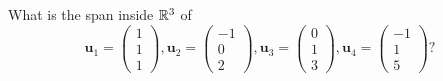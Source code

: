 \documentclass[10pt, a4paper]{article}
\newcommand{\mbf}[1]{\mathbf{#1}}
\begin{document}
\begin{example}
    What is the span inside $\mathbb{R} ^ 3$ of
    \[
    \mbf{u}_1 = \begin{pmatrix}
        1 \\ 1 \\ 1
    \end{pmatrix},
    \mbf{u}_2 = \begin{pmatrix}
        -1 \\ 0 \\ 2
    \end{pmatrix},
    \mbf{u}_3 = \begin{pmatrix}
        0 \\ 1 \\ 3
    \end{pmatrix},
    \mbf{u}_4 = \begin{pmatrix}
        -1 \\ 1 \\ 5
    \end{pmatrix}?
    \]


\end{example}
\end{document}
